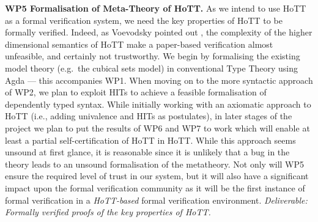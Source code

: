 \documentclass[a4paper,11pt]{article}
\newcommand{\eg}{{e.g.}\ }
\begin{document}
{\bf WP5 Formalisation of Meta-Theory of HoTT.}  As we intend to use
HoTT as a formal verification system, we need the key properties of
HoTT to be formally verified. Indeed, as Voevodsky pointed out
\cite{voevodsky-ias14}, the complexity of the higher dimensional
semantics of HoTT make a paper-based verification almost unfeasible, and
certainly not trustworthy. We begin by formalising the existing model
theory (\eg the cubical sets model) in conventional Type Theory using
Agda --- this accompanies WP1. When moving on to the more syntactic
approach of WP2, we plan to exploit HITs to achieve a feasible
formalisation of dependently typed syntax. While initially working
with an axiomatic approach to HoTT (i.e., adding univalence and HITs as
postulates), in later stages of the project we plan to put the results
of WP6 and WP7 to work which will enable at least a partial
self-certification of HoTT in HoTT.  While this approach seems unsound at
first glance, it is reasonable since it is unlikely that a bug in
the theory leads to an unsound formalisation of the metatheory.  Not
only will WP5 ensure the required level of trust in our system, but it
will also have a significant impact upon the formal verification
community as it will be the first instance of formal verification in
a {\em HoTT-based} formal verification environment. {\em Deliverable:
  Formally verified proofs of the key properties of
  HoTT. 
}
\end{document}
